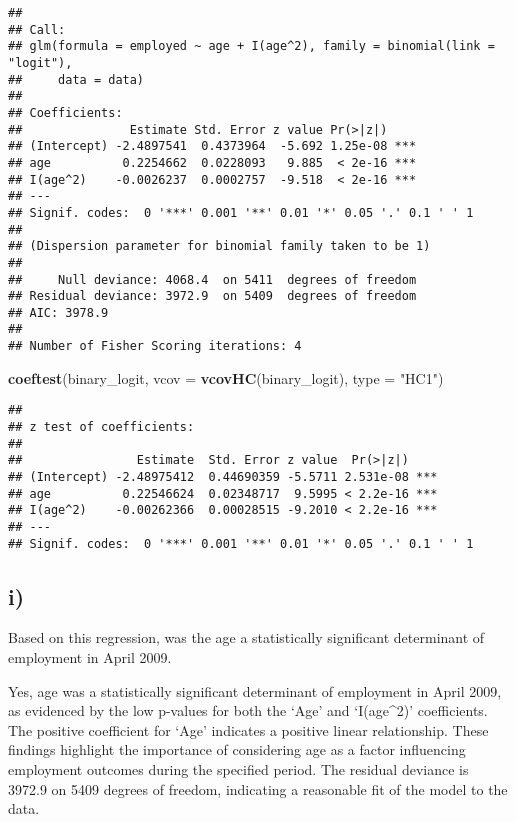 \documentclass[
]{article}
\newenvironment{Shaded}{\begin{snugshade}}{\end{snugshade}}
\newcommand{\AttributeTok}[1]{\textcolor[rgb]{0.13,0.29,0.53}{#1}}
\newcommand{\FunctionTok}[1]{\textcolor[rgb]{0.13,0.29,0.53}{\textbf{#1}}}
\newcommand{\NormalTok}[1]{#1}
\newcommand{\StringTok}[1]{\textcolor[rgb]{0.31,0.60,0.02}{#1}}
\begin{document}
\begin{verbatim}
## 
## Call:
## glm(formula = employed ~ age + I(age^2), family = binomial(link = "logit"), 
##     data = data)
## 
## Coefficients:
##               Estimate Std. Error z value Pr(>|z|)    
## (Intercept) -2.4897541  0.4373964  -5.692 1.25e-08 ***
## age          0.2254662  0.0228093   9.885  < 2e-16 ***
## I(age^2)    -0.0026237  0.0002757  -9.518  < 2e-16 ***
## ---
## Signif. codes:  0 '***' 0.001 '**' 0.01 '*' 0.05 '.' 0.1 ' ' 1
## 
## (Dispersion parameter for binomial family taken to be 1)
## 
##     Null deviance: 4068.4  on 5411  degrees of freedom
## Residual deviance: 3972.9  on 5409  degrees of freedom
## AIC: 3978.9
## 
## Number of Fisher Scoring iterations: 4
\end{verbatim}

\begin{Shaded}
\begin{Highlighting}[]
\FunctionTok{coeftest}\NormalTok{(binary\_logit, }\AttributeTok{vcov =} \FunctionTok{vcovHC}\NormalTok{(binary\_logit), }\AttributeTok{type =} \StringTok{"HC1"}\NormalTok{)                     }
\end{Highlighting}
\end{Shaded}

\begin{verbatim}
## 
## z test of coefficients:
## 
##                Estimate  Std. Error z value  Pr(>|z|)    
## (Intercept) -2.48975412  0.44690359 -5.5711 2.531e-08 ***
## age          0.22546624  0.02348717  9.5995 < 2.2e-16 ***
## I(age^2)    -0.00262366  0.00028515 -9.2010 < 2.2e-16 ***
## ---
## Signif. codes:  0 '***' 0.001 '**' 0.01 '*' 0.05 '.' 0.1 ' ' 1
\end{verbatim}

\hypertarget{i-2}{%
\subsection{i)}\label{i-2}}

Based on this regression, was the age a statistically significant
determinant of employment in April 2009. \vspace{1em}

Yes, age was a statistically significant determinant of employment in
April 2009, as evidenced by the low p-values for both the `Age' and
`I(age\^{}2)' coefficients. The positive coefficient for `Age' indicates
a positive linear relationship. These findings highlight the importance
of considering age as a factor influencing employment outcomes during
the specified period. The residual deviance is 3972.9 on 5409 degrees of
freedom, indicating a reasonable fit of the model to the data.
\end{document}
